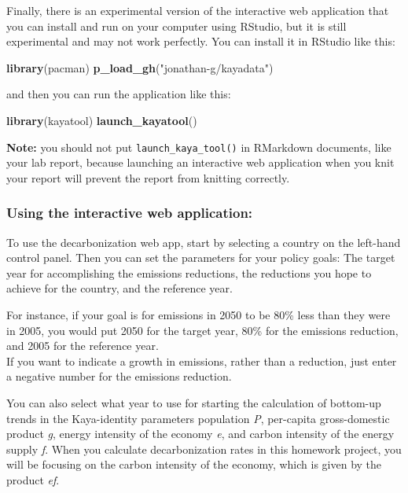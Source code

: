 \documentclass[
]{article}
\newenvironment{Shaded}{\begin{snugshade}}{\end{snugshade}}
\newcommand{\KeywordTok}[1]{\textcolor[rgb]{0.13,0.29,0.53}{\textbf{#1}}}
\newcommand{\NormalTok}[1]{#1}
\newcommand{\StringTok}[1]{\textcolor[rgb]{0.31,0.60,0.02}{#1}}
\begin{document}
Finally, there is an experimental version of the interactive web
application that you can install and run on your computer using RStudio,
but it is still experimental and may not work perfectly. You can install
it in RStudio like this:

\begin{Shaded}
\begin{Highlighting}[]
\KeywordTok{library}\NormalTok{(pacman)}
\KeywordTok{p_load_gh}\NormalTok{(}\StringTok{"jonathan-g/kayadata"}\NormalTok{)}
\end{Highlighting}
\end{Shaded}

and then you can run the application like this:

\begin{Shaded}
\begin{Highlighting}[]
\KeywordTok{library}\NormalTok{(kayatool)}
\KeywordTok{launch_kayatool}\NormalTok{()}
\end{Highlighting}
\end{Shaded}

\textbf{Note:} you should not put \texttt{launch\_kaya\_tool()} in
RMarkdown documents, like your lab report, because launching an
interactive web application when you knit your report will prevent the
report from knitting correctly.

\hypertarget{using-the-interactive-web-application}{%
\subsubsection{Using the interactive web
application:}\label{using-the-interactive-web-application}}

To use the decarbonization web app, start by selecting a country on the
left-hand control panel. Then you can set the parameters for your policy
goals: The target year for accomplishing the emissions reductions, the
reductions you hope to achieve for the country, and the reference year.

For instance, if your goal is for emissions in 2050 to be 80\% less than
they were in 2005, you would put 2050 for the target year, 80\% for the
emissions reduction, and 2005 for the reference year.\\
If you want to indicate a growth in emissions, rather than a reduction,
just enter a negative number for the emissions reduction.

You can also select what year to use for starting the calculation of
bottom-up trends in the Kaya-identity parameters population \emph{P},
per-capita gross-domestic product \emph{g}, energy intensity of the
economy \emph{e}, and carbon intensity of the energy supply \emph{f}.
When you calculate decarbonization rates in this homework project, you
will be focusing on the carbon intensity of the economy, which is given
by the product \emph{ef}.
\end{document}
